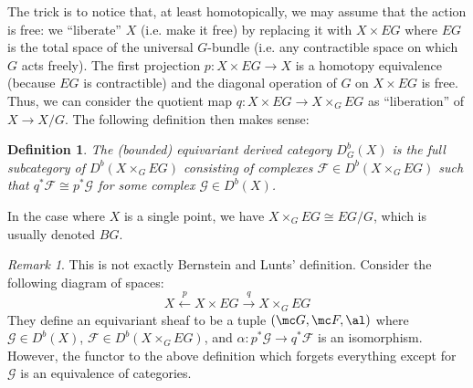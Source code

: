 \documentclass[12pt]{wart}
\newtheorem{defi}{Definition}
\theoremstyle{remark}
\newtheorem{remark}{Remark}
\begin{document}


The trick is to notice that, at least homotopically, we may assume
that the action is free: we ``liberate'' $X$ (i.e. make it free) by
replacing it with $X \times EG$ where $EG$ is the total space of the
universal $G$-bundle (i.e. any contractible space on which $G$ acts
freely). The first projection $p : X \times EG \to X$ is a homotopy
equivalence (because $EG$ is contractible) and the diagonal operation
of $G$ on $X \times EG$ is free. Thus, we can consider the quotient
map $q : X \times EG \to X \times_G EG$ as ``liberation'' of $X\to
X/G$. The following definition then makes sense:

\begin{defi} 
The \emph{(bounded) equivariant derived category} $D^b_G(X)$ is the
  full subcategory of $D^b(X \times_G EG)$ consisting of complexes
  $\mathcal{F} \in D^b(X \times_G EG)$ such that $q^*\mathcal{F} \cong
  p^*\mathcal{G}$ for some complex $\mathcal{G} \in D^b(X)$. 
\end{defi}

In the case where $X$ is a single point, we have $X\times_G EG\cong
EG/G$, which is usually denoted $BG$.

\begin{remark} 
  This is not exactly Bernstein and Lunts' definition. Consider the
  following diagram of spaces:
  \begin{equation*}
    X \stackrel{p}{\gets} X \times EG \stackrel{q}{\to} X \times_G EG
  \end{equation*}
  They define an equivariant sheaf to be a tuple $(\mc G, \mc F,\al)$
  where $\mathcal{G}\in D^b(X)$, $\mathcal{F}\in D^b(X\times_G EG)$,
  and $\alpha: p^*\mathcal{G}\to q^*\mathcal{F}$ is an isomorphism.
  However, the functor to the above definition
  which forgets everything except for $\mathcal{G}$ is an equivalence
  of categories.
\end{remark}
\end{document}
